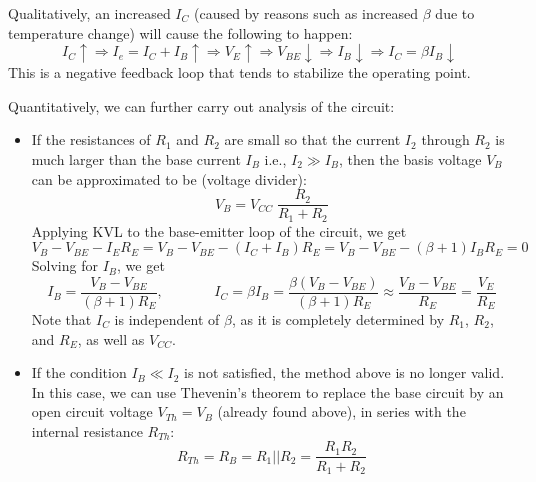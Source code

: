 \documentclass{article}
\begin{document}

Qualitatively, an increased $I_C$ (caused by reasons such as 
increased $\beta$ due to temperature change) will cause the following
to happen:
\begin{equation}
  I_C \uparrow \Longrightarrow   I_e=I_C+I_B \uparrow 
  \Longrightarrow V_E \uparrow \Longrightarrow V_{BE} 
  \downarrow \Longrightarrow I_B \downarrow \Longrightarrow 
  I_C=\beta I_B \downarrow	
\end{equation}
This is a negative feedback loop that tends to stabilize the operating
point.

Quantitatively, we can further carry out analysis of the circuit:
\begin{itemize}
\item If the resistances of $R_1$ and $R_2$ are small so that the 
  current $I_2$ through $R_2$ is much larger than the base current 
  $I_B$ i.e., $I_2\gg I_B$, then the basis voltage $V_B$ can be
  approximated to be (voltage divider):
  \begin{equation}
    V_B = V_{CC} \;\frac{R_2}{R_1+R_2}	
  \end{equation}
  Applying KVL to the base-emitter loop of the circuit, we get
  \begin{equation}
    V_B-V_{BE}-I_ER_E=V_B-V_{BE}-(I_C+I_B)R_E=V_B-V_{BE}-(\beta+1)I_BR_E=0 
  \end{equation}
  Solving for $I_B$, we get
  \begin{equation} 
    I_B=\frac{V_B-V_{BE}}{(\beta+1)R_E},\;\;\;\;\;\;\;\;\;\;\;\;\;
    I_C=\beta I_B=\frac{\beta(V_B-V_{BE})}{(\beta+1)R_E}
    \approx \frac{V_B-V_{BE}}{R_E} =\frac{V_E}{R_E} 
  \end{equation}
  Note that $I_C$ is independent of $\beta$, as it is completely
  determined by $R_1$, $R_2$, and $R_E$, as well as $V_{CC}$.

\item If the condition $I_B \ll I_2$ is not satisfied, the method 
  above is no longer valid. In this case, we can use Thevenin's theorem 
  to replace the base circuit by an open circuit voltage $V_{Th}=V_B$ 
  (already found above), in series with the internal resistance $R_{Th}$:
  \begin{equation}
    R_{Th}=R_B=R_1||R_2=\frac{R_1R_2}{R_1+R_2}	
  \end{equation}



\end{itemize}
\end{document}
